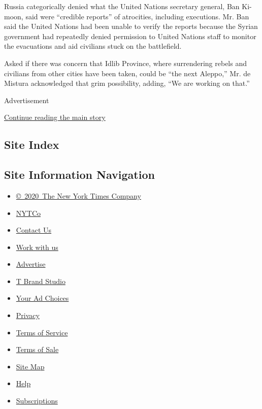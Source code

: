 Russia categorically denied what the United Nations secretary general,
Ban Ki-moon, said were ``credible reports'' of atrocities, including
executions. Mr. Ban said the United Nations had been unable to verify
the reports because the Syrian government had repeatedly denied
permission to United Nations staff to monitor the evacuations and aid
civilians stuck on the battlefield.

Asked if there was concern that Idlib Province, where surrendering
rebels and civilians from other cities have been taken, could be ``the
next Aleppo,'' Mr. de Mistura acknowledged that grim possibility,
adding, ``We are working on that.''

Advertisement

\protect\hyperlink{after-bottom}{Continue reading the main story}

\hypertarget{site-index}{%
\subsection{Site Index}\label{site-index}}

\hypertarget{site-information-navigation}{%
\subsection{Site Information
Navigation}\label{site-information-navigation}}

\begin{itemize}
\tightlist
\item
  \href{https://help.nytimes3xbfgragh.onion/hc/en-us/articles/115014792127-Copyright-notice}{©~2020~The
  New York Times Company}
\end{itemize}

\begin{itemize}
\tightlist
\item
  \href{https://www.nytco.com/}{NYTCo}
\item
  \href{https://help.nytimes3xbfgragh.onion/hc/en-us/articles/115015385887-Contact-Us}{Contact
  Us}
\item
  \href{https://www.nytco.com/careers/}{Work with us}
\item
  \href{https://nytmediakit.com/}{Advertise}
\item
  \href{http://www.tbrandstudio.com/}{T Brand Studio}
\item
  \href{https://www.nytimes3xbfgragh.onion/privacy/cookie-policy\#how-do-i-manage-trackers}{Your
  Ad Choices}
\item
  \href{https://www.nytimes3xbfgragh.onion/privacy}{Privacy}
\item
  \href{https://help.nytimes3xbfgragh.onion/hc/en-us/articles/115014893428-Terms-of-service}{Terms
  of Service}
\item
  \href{https://help.nytimes3xbfgragh.onion/hc/en-us/articles/115014893968-Terms-of-sale}{Terms
  of Sale}
\item
  \href{https://spiderbites.nytimes3xbfgragh.onion}{Site Map}
\item
  \href{https://help.nytimes3xbfgragh.onion/hc/en-us}{Help}
\item
  \href{https://www.nytimes3xbfgragh.onion/subscription?campaignId=37WXW}{Subscriptions}
\end{itemize}
